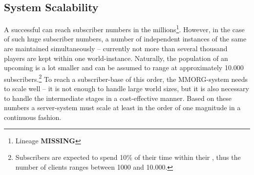 \documentclass[a4paper, 10pt]{book}
\begin{document}


\subsection{System Scalability}
\label{sec:scalability}

A successful \MMORG can reach subscriber numbers in the
millions\footnote{Lineage \textbf{MISSING}}. However, in the case of
such huge subscriber numbers, a number of independent instances of the
same \MMORG are maintained simultaneously -- currently not more than
several thousand players are kept within one world-instance.
%
Naturally, the population of an upcoming \MMORG is a lot smaller and
can be assumed to range at approximately 10.000
subscribers.\footnote{Subscribers are expected to spend 10\% of their
time within their \MMORG, thus the number of clients ranges between
1000 and 10.000.}
%
To reach a subscriber-base of this order, the MMORG-system needs to
scale well -- it is not enough to handle large world sizes, but it is
also necessary to handle the intermediate stages in a cost-effective
manner. Based on these numbers a \MMORG server-system must scale at
least in the order of one magnitude in a continuous fashion.
\end{document}
